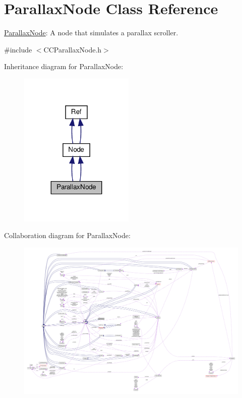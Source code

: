 \hypertarget{classParallaxNode}{}\section{Parallax\+Node Class Reference}
\label{classParallaxNode}


\hyperlink{classParallaxNode}{Parallax\+Node}\+: A node that simulates a parallax scroller.  




{\ttfamily \#include $<$C\+C\+Parallax\+Node.\+h$>$}



Inheritance diagram for Parallax\+Node\+:
\nopagebreak
\begin{figure}[H]
\begin{center}
\leavevmode
\includegraphics[width=155pt]{classParallaxNode__inherit__graph}
\end{center}
\end{figure}


Collaboration diagram for Parallax\+Node\+:
\nopagebreak
\begin{figure}[H]
\begin{center}
\leavevmode
\includegraphics[width=350pt]{classParallaxNode__coll__graph}
\end{center}
\end{figure}
